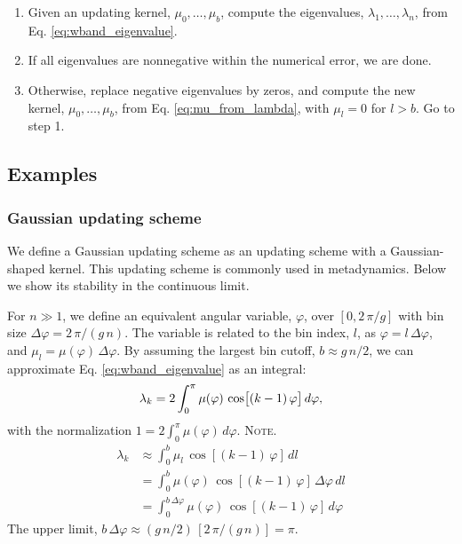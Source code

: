 \documentclass[reprint, superscriptaddress, floatfix]{revtex4-1}
\newcommand{\note}[1]{{\color{DarkGreen}\footnotesize \textsc{Note.} #1}}
\begin{document}
%
\begin{enumerate}
  \item
    Given an updating kernel, $\mu_0, \dots, \mu_b$,
    compute the eigenvalues,
    $\lambda_1, \dots, \lambda_n$,
    from Eq. \eqref{eq:wband_eigenvalue}.
  \item
    If all eigenvalues are nonnegative within the numerical error,
    we are done. %
  \item
    Otherwise, replace negative eigenvalues by zeros,
    and compute the new kernel,
    $\mu_0, \dots, \mu_b$, from
    Eq. \eqref{eq:mu_from_lambda},
    with $\mu_l = 0$ for $l > b$.
    Go to step 1.
\end{enumerate}



\subsection{Examples}



\subsubsection{Gaussian updating scheme}



We define a Gaussian updating scheme
as an updating scheme with a
Gaussian-shaped kernel.
%
This updating scheme is commonly
used in metadynamics.
%
Below we show its stability
in the continuous limit.



For $n \gg 1$,
we define an equivalent angular variable, $\varphi$,
over $[0, 2 \, \pi/g]$
with bin size
$\Delta \varphi = 2 \, \pi/(g \, n)$.
The variable is related to the bin index, $l$, as
$\varphi = l \, \Delta \varphi$,
and
$\mu_l = \mu(\varphi) \, \Delta \varphi$.
%
By assuming the largest bin cutoff, $b \approx g \, n/2$,
we can approximate Eq. \eqref{eq:wband_eigenvalue}
as an integral:
%
\begin{equation}
  \lambda_k
  =
  2 \int_0^\pi
    \mu(\varphi) \, \cos \bigl[ (k-1) \, \varphi \bigr] \, d\varphi,
\notag
\end{equation}
%
with the normalization
%
$
  1 = 2 \int_0^\pi \mu(\varphi) \, d\varphi.
$
\note{
\begin{align*}
  \lambda_k
  &\approx
  \int_0^b \mu_l \, \cos[(k-1) \, \varphi] \, dl
  \\
  &=
  \int_0^b \mu(\varphi) \, \cos[(k-1) \, \varphi] \, \Delta \varphi \, dl
  \\
  &=
  \int_0^{b \, \Delta \varphi} \mu(\varphi) \, \cos[(k-1) \, \varphi] \, d\varphi
\end{align*}
The upper limit,
$b \, \Delta \varphi \approx (g\,n/2) \, [2\,\pi/(g\,n)] = \pi$.
}
\end{document}
